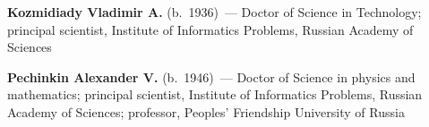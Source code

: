 \begin{multicols}{2}
\vspace*{3pt}

\noindent
\textbf{Kozmidiady Vladimir A.} (b.\ 1936)~--- Doctor of Science in Technology;
principal scientist, Institute of Informatics Problems,  Russian Academy of Sciences
\columnbreak









\noindent
\textbf{Pechinkin Alexander V.} (b.\ 1946)~--- Doctor of Science in physics and mathematics;
principal scientist, Institute of Informatics Problems, Russian Academy of
Sciences; professor, Peoples' Friendship University of Russia











\end{multicols}
